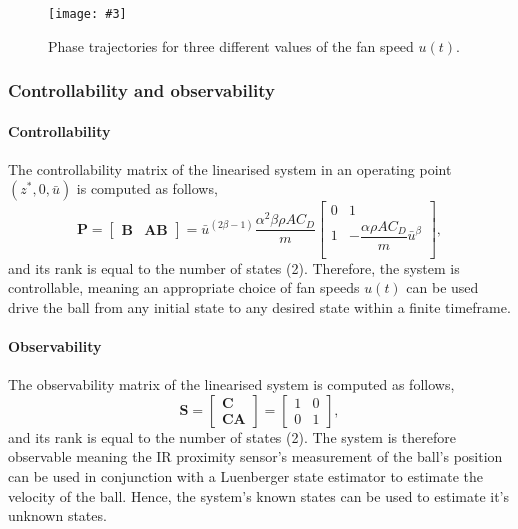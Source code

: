 \documentclass[10pt,twoside,openright]{article}
\newcommand{\mijnfiguur}[5][ht]{            %
    \begin{figure}[#1]                      %
        \begin{center}                      %
            \texttt{[image: \#3]}        %
        \end{center}
        \caption{#4\label{#5}}          %
    \end{figure}
    }
\begin{document}
\mijnfiguur[h!]{width=\textwidth}{streamPlots.pdf}{Phase trajectories for three different values of the fan speed $u(t)$.}{fig:streamPlots}

\subsubsection{Controllability and observability}\label{section:controllability}

\paragraph{Controllability} The controllability matrix of the linearised system in an operating point $(z^*, 0, \bar{u})$ is computed as follows,
\begin{equation}\label{eq:controllability}
\bm{P}
=
\begin{bmatrix}
\bm{B} & \bm{AB}
\end{bmatrix}
=
\bar{u}^{\left(2\beta-1\right)} \dfrac{\alpha^2 \beta \rho A C_D}{m}
\begin{bmatrix}
0 & 1 \\
1 & - \dfrac{\alpha \rho A C_D}{m} \bar{u}^\beta \\
\end{bmatrix},
\end{equation}
and its rank is equal to the number of states (2). Therefore, the system is controllable, meaning an appropriate choice of fan speeds $u(t)$ can be used drive the ball from any initial state to any desired state within a finite timeframe.

\paragraph{Observability} The observability matrix of the linearised system is computed as follows,
\begin{equation}\label{eq:observability}
\bm{S}
=
\begin{bmatrix}
\bm{C} \\
\bm{CA}
\end{bmatrix}
= 
\begin{bmatrix}
1 & 0 \\
0 & 1
\end{bmatrix},
\end{equation}
and its rank is equal to the number of states (2). The system is therefore observable meaning the IR proximity sensor's measurement of the ball's position can be used in conjunction with a Luenberger state estimator to estimate the velocity of the ball. Hence, the system's known states can be used to estimate it's unknown states.
\end{document}
